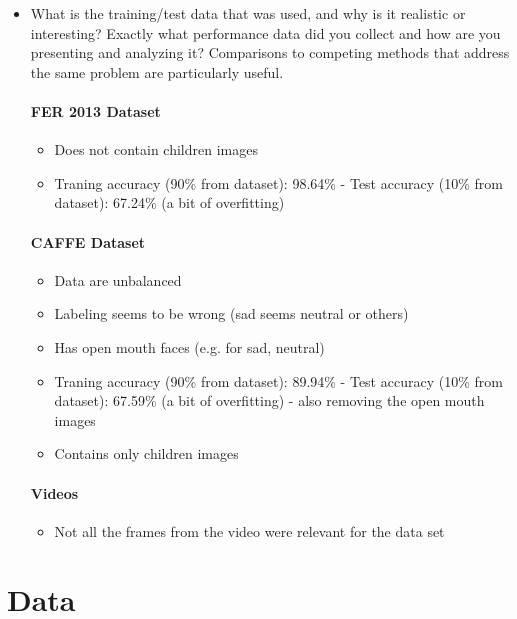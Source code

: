 \documentclass[runningheads,a4paper,11pt]{report}
\begin{document}
\begin{itemize}
	\item What is the training/test data that was used, and why is it realistic or interesting? Exactly what performance data did you collect and how are you presenting and analyzing it? Comparisons to competing methods that address the same problem are particularly useful.
  \paragraph{FER 2013 Dataset}
  \begin{itemize}
    \item Does not contain children images
    \item Traning accuracy (90\% from dataset): 98.64\% - Test accuracy (10\% from dataset): 67.24\% (a bit of overfitting)
  \end{itemize}

  \paragraph{CAFFE Dataset}

  \begin{itemize}
    \item Data are unbalanced
    \item Labeling seems to be wrong (sad seems neutral or others)
    \item Has open mouth faces (e.g. for sad, neutral)
    \item Traning accuracy (90\% from dataset): 89.94\% - Test accuracy (10\% from dataset): 67.59\% (a bit of overfitting) - also removing the open mouth images
    \item Contains only children images
  \end{itemize}

 \paragraph{Videos}
   \begin{itemize}
    \item Not all the frames from the video were relevant for the data set
  \end{itemize}

\end{itemize}

\section{Data}
\label{section:data}
\end{document}
